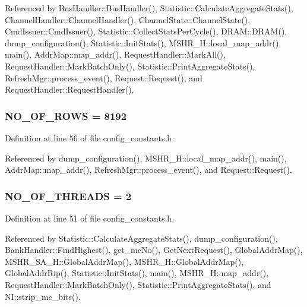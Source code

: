 Referenced by BusHandler::BusHandler(), Statistic::CalculateAggregateStats(), ChannelHandler::ChannelHandler(), ChannelState::ChannelState(), CmdIssuer::CmdIssuer(), Statistic::CollectStatsPerCycle(), DRAM::DRAM(), dump\_\-configuration(), Statistic::InitStats(), MSHR\_\-H::local\_\-map\_\-addr(), main(), AddrMap::map\_\-addr(), RequestHandler::MarkAll(), RequestHandler::MarkBatchOnly(), Statistic::PrintAggregateStats(), RefreshMgr::process\_\-event(), Request::Request(), and RequestHandler::RequestHandler().
\subsubsection[{NO\_\-OF\_\-ROWS}]{ {\bf NO\_\-OF\_\-ROWS} = 8192}\label{config__constants_8h_b3d6bbcaed3c5e9c84170ea78a55ac79}




Definition at line 56 of file config\_\-constants.h.

Referenced by dump\_\-configuration(), MSHR\_\-H::local\_\-map\_\-addr(), main(), AddrMap::map\_\-addr(), RefreshMgr::process\_\-event(), and Request::Request().
\subsubsection[{NO\_\-OF\_\-THREADS}]{ {\bf NO\_\-OF\_\-THREADS} = 2}\label{config__constants_8h_550c282169249cd6a9f0eb1b19bb8e04}




Definition at line 51 of file config\_\-constants.h.

Referenced by Statistic::CalculateAggregateStats(), dump\_\-configuration(), BankHandler::FindHighest(), get\_\-mcNo(), GetNextRequest(), GlobalAddrMap(), MSHR\_\-SA\_\-H::GlobalAddrMap(), MSHR\_\-H::GlobalAddrMap(), GlobalAddrRip(), Statistic::InitStats(), main(), MSHR\_\-H::map\_\-addr(), RequestHandler::MarkBatchOnly(), Statistic::PrintAggregateStats(), and NI::strip\_\-mc\_\-bits().
